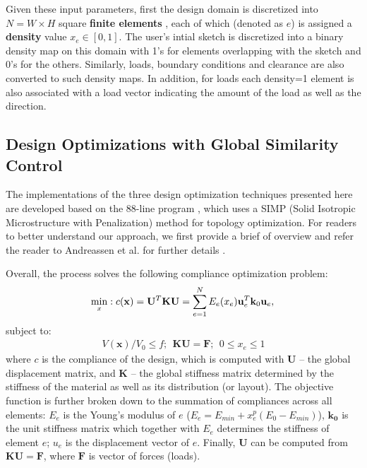 Given these input parameters, first the design domain is discretized into $N=W \times H$ square \textbf{finite elements} \cite{zienkiewicz1977finite}, each of which (denoted as $e$) is assigned a \textbf{density} value $x_e \in [0, 1]$. The user's intial sketch is discretized into a binary density map on this domain with 1's for elements overlapping with the sketch and 0's for the others. Similarly, loads, boundary conditions and clearance are also converted to such density maps.  In addition, for loads each density=1 element is also associated with a load vector indicating the amount of the load as well as the direction. 

%

\subsection{Design Optimizations with Global Similarity Control}
The implementations of the three design optimization techniques presented here are developed based on the 88-line program \cite{andreassen2011efficient}, which uses a SIMP (Solid Isotropic Microstructure with Penalization) method for topology optimization. For readers to better understand our approach, we first provide a brief of overview and refer the reader to Andreassen et al. for further details \cite{andreassen2011efficient}.

Overall, the process solves the following compliance optimization problem:
\begin{equation}
	\min_x: c(\mathbf{x}) = \mathbf{U}^T\mathbf{K}\mathbf{U} = \sum^N_{e=1} E_e(x_e)\mathbf{u}_e^T\mathbf{k}_0\mathbf{u}_e,\\
\end{equation}
	subject to:
\begin{gather*}
	{V(\mathbf{x}) / V_0} \leq f ; ~~ 
	\mathbf{K}\mathbf{U} = \mathbf{F};  ~~
	0 \leq x_e \leq 1
\end{gather*}
where $c$ is the compliance of the design, which is computed with $\mathbf{U}$ -- the global displacement matrix, and $\mathbf{K}$ -- the global stiffness matrix determined by the stiffness of the material as well as its distribution (or layout). The objective function is further broken down to the summation of compliances across all elements: $E_e$ is the Young's modulus of $e$ ($E_e = E_{min} + x_e^p(E_0 - E_{min})$), $\mathbf{k_0}$ is the unit stiffness matrix which together with $E_e$ determines the stiffness of element $e$; $u_e$ is the displacement vector of $e$. Finally, $\mathbf{U}$ can be computed from $\mathbf{K}\mathbf{U} = \mathbf{F}$, where $\mathbf{F}$ is vector of forces (loads).

